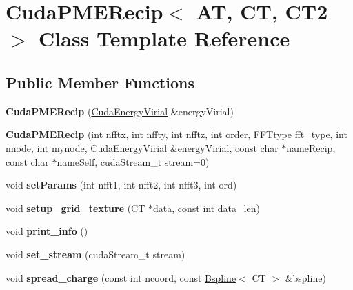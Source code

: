 \hypertarget{classCudaPMERecip}{}\section{Cuda\+P\+M\+E\+Recip$<$ AT, CT, C\+T2 $>$ Class Template Reference}
\label{classCudaPMERecip}
\subsection*{Public Member Functions}
\begin{DoxyCompactItemize}
\item 
\hypertarget{classCudaPMERecip_ab603d7df52a74df1ec8a297e7c7960ff}{}\label{classCudaPMERecip_ab603d7df52a74df1ec8a297e7c7960ff} 
{\bfseries Cuda\+P\+M\+E\+Recip} (\hyperlink{classCudaEnergyVirial}{Cuda\+Energy\+Virial} \&energy\+Virial)
\item 
\hypertarget{classCudaPMERecip_a8d7162c8b90917765687af7e9084022a}{}\label{classCudaPMERecip_a8d7162c8b90917765687af7e9084022a} 
{\bfseries Cuda\+P\+M\+E\+Recip} (int nfftx, int nffty, int nfftz, int order, F\+F\+Ttype fft\+\_\+type, int nnode, int mynode, \hyperlink{classCudaEnergyVirial}{Cuda\+Energy\+Virial} \&energy\+Virial, const char $\ast$name\+Recip, const char $\ast$name\+Self, cuda\+Stream\+\_\+t stream=0)
\item 
\hypertarget{classCudaPMERecip_aea4a4ba79bc3019bc42cb84edb484dc3}{}\label{classCudaPMERecip_aea4a4ba79bc3019bc42cb84edb484dc3} 
void {\bfseries set\+Params} (int nfft1, int nfft2, int nfft3, int ord)
\item 
\hypertarget{classCudaPMERecip_a44888114a2db33858b3c14bc0e2d4715}{}\label{classCudaPMERecip_a44888114a2db33858b3c14bc0e2d4715} 
void {\bfseries setup\+\_\+grid\+\_\+texture} (CT $\ast$data, const int data\+\_\+len)
\item 
\hypertarget{classCudaPMERecip_a68539c2121342493a6e1ed24c7cd24c3}{}\label{classCudaPMERecip_a68539c2121342493a6e1ed24c7cd24c3} 
void {\bfseries print\+\_\+info} ()
\item 
\hypertarget{classCudaPMERecip_ae9bd543d63eb7897a572e8a074bd3126}{}\label{classCudaPMERecip_ae9bd543d63eb7897a572e8a074bd3126} 
void {\bfseries set\+\_\+stream} (cuda\+Stream\+\_\+t stream)
\item 
\hypertarget{classCudaPMERecip_a4f1a154c20e19da29d785719956eef2b}{}\label{classCudaPMERecip_a4f1a154c20e19da29d785719956eef2b} 
void {\bfseries spread\+\_\+charge} (const int ncoord, const \hyperlink{classBspline}{Bspline}$<$ CT $>$ \&bspline)

\end{DoxyCompactItemize}
